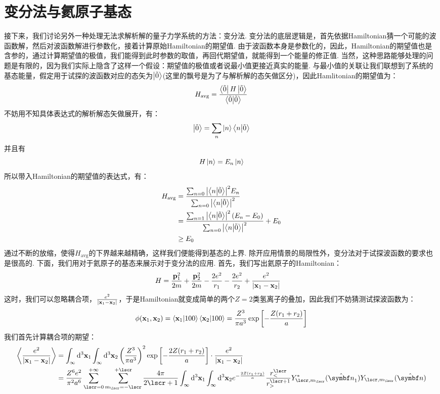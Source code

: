 \section{变分法与氦原子基态}
接下来，我们讨论另外一种处理无法求解析解的量子力学系统的方法：变分法. 变分法的底层逻辑是，首先依据Hamiltonian猜一个可能的波函数解，然后对波函数解进行参数化，接着计算原始Hamiltonian的期望值. 由于波函数本身是参数化的，因此，Hamiltonian的期望值也是含参的，通过计算期望值的极值，我们能得到此时参数的取值，再回代期望值，就能得到一个能量的修正值. 当然，这种思路能够处理的问题是有限的，因为我们实际上隐含了这样一个假设：期望值的极值或者说最小值更接近真实的能量. 与最小值的关联让我们联想到了系统的基态能量，假定用于试探的波函数对应的态矢为\(\ket{\tilde{0}}\)(这里的飘号是为了与解析解的态矢做区分)，因此Hamlitonian的期望值为：
\[
H_{\mathrm{avg}} = \frac{\bra{\tilde{0}}H\ket{\tilde{0}}}{\bra{\tilde{0}}\ket{\tilde{0}}}
\]
不妨用不知具体表达式的解析解态矢做展开，有：
\begin{align*}
\ket{\tilde{0}} = \sum_{n}\ket{n}\bra{n}\ket{\tilde{0}}
\end{align*}
并且有
\[
H\ket{n} = E_{n}\ket{n}
\]
所以带入Hamiltonian的期望值的表达式，有：
\begin{align*}
H_{\mathrm{avg}} 
& = \frac{\sum_{n=0}\abs{\bra{n}\ket{\tilde{0}}}^{2}E_{n}}{\sum_{n=0}\abs{\bra{n}\ket{\tilde{0}}}^{2}} \\
& = \frac{\sum_{n=1}\abs{\bra{n}\ket{\tilde{0}}}^{2}\left({E_{n} - E_{0}}\right)}{\sum_{n=0}\abs{\bra{n}\ket{\tilde{0}}}^{2}} + E_{0} \\
& \geq E_{0}
\end{align*}
通过不断的放缩，使得\(H_{\mathrm{avg}}\)的下界越来越精确，这样我们便能得到基态的上界. 除开应用情景的局限性外，变分法对于试探波函数的要求也是很高的. 下面，我们用对于氦原子的基态来展示对于变分法的应用. 首先，我们写出氦原子的Hamiltonian：
\begin{align*}
H
& = \frac{\mathbf{p}_{1}^{2}}{2m} + \frac{\mathbf{p}_{2}^{2}}{2m} - \frac{2e^{2}}{r_{1}} - \frac{2e^{2}}{r_{2}} + \frac{e^{2}}{\abs{\mathbf{x}_{1} - \mathbf{x}_{2}}}
\end{align*}
这时，我们可以忽略耦合项，\(\frac{e^{2}}{\abs{\mathbf{x}_{1} - \mathbf{x}_{2}}}\)，于是Hamiltonian就变成简单的两个\(Z=2\)类氢离子的叠加，因此我们不妨猜测试探波函数为：
\[
\phi(\mathbf{x}_{1},\mathbf{x}_{2}) = \bra{\mathbf{x}_{1}}\ket{100}\bra{\mathbf{x}_{2}}\ket{100} = \frac{Z^{3}}{\pi a^{3}}\exp\left[{-\frac{Z(r_{1}+r_{2})}{a}}\right]
\]
我们首先计算耦合项的期望：
\begin{align*}
\avg{\frac{e^{2}}{\abs{\vr_{1}-\vr_{2}}}}
& = \int_{\infty}\dd^{3}\vr_{1}\int_{\infty}\dd^{3}\vr_{2} \br{\frac{Z^{3}}{\pi a^{3}}}^{2}\exp\mbr{-\frac{2Z(r_{1}+r_{2})}{a}}\cdot\frac{e^{2}}{\abs{\vr_{1}-\vr_{2}}} \\
& = \frac{Z^{6}e^{2}}{\pi^{2}a^{6}}\sum_{\lscr=0}^{+\infty}\sum_{m_{\lscr}=-\lscr}^{+\lscr}\frac{4\pi}{2\lscr+1}\int_{\infty}\dd^{3}\vr_{1}\int_{\infty}\dd^{3}\vr_{2}e^{-\frac{2Z(r_{1} + r_{2})}{a}}\frac{r_{<}^{\lscr}}{r_{>}^{\lscr+1}}Y_{\lscr,m_{\lscr}}^{*}(\uv{n}_{1})Y_{\lscr,m_{\lscr}}(\uv{n}) \\
\end{align*}
